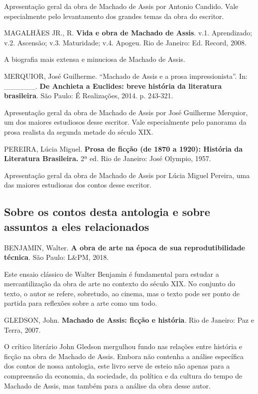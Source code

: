 \documentclass[12pt]{extarticle}
\begin{document}
Apresentação geral da obra de Machado de Assis por Antonio Candido. Vale
especialmente pelo levantamento dos grandes temas da obra do escritor.

MAGALHÃES JR., R. \textbf{Vida e obra de Machado de Assis}. v.1.
Aprendizado; v.2. Ascensão; v.3. Maturidade; v.4. Apogeu. Rio de
Janeiro: Ed. Record, 2008.

A biografia mais extensa e minuciosa de Machado de Assis.

MERQUIOR, José Guilherme. ``Machado de Assis e a prosa impressionista''.
In: \_\_\_\_\_\_. \textbf{De Anchieta a Euclides: breve história da
literatura brasileira}. São Paulo: É Realizações, 2014. p. 243-321.

Apresentação geral da obra de Machado de Assis por José Guilherme
Merquior, um dos maiores estudiosos desse escritor. Vale especialmente
pelo panorama da prosa realista da segunda metade do século XIX.

PEREIRA, Lúcia Miguel. \textbf{Prosa de ficção (de 1870 a 1920):
História da Literatura Brasileira.} 2ª ed. Rio de Janeiro: José Olympio,
1957.

Apresentação geral da obra de Machado de Assis por Lúcia Miguel Pereira,
uma das maiores estudiosas dos contos desse escritor.

\subsection{Sobre os contos desta antologia e sobre assuntos a eles relacionados}

BENJAMIN, Walter. \textbf{A obra de arte na época de sua
reprodutibilidade técnica}. São Paulo: L\&PM, 2018.

Este ensaio clássico de Walter Benjamin é fundamental para estudar a
mercantilização da obra de arte no contexto do século XIX. No conjunto
do texto, o autor se refere, sobretudo, ao cinema, mas o texto pode ser
ponto de partida para reflexões sobre a arte como um todo.

GLEDSON, John. \textbf{Machado de Assis: ficção e história}. Rio de
Janeiro: Paz e Terra, 2007.

O crítico literário John Gledson mergulhou fundo nas relações entre
história e ficção na obra de Machado de Assis. Embora não contenha a
análise específica dos contos de nossa antologia, este livro serve de
esteio não apenas para a compreensão da economia, da sociedade, da
política e da cultura do tempo de Machado de Assis, mas também para a
análise da obra desse autor.
\end{document}
